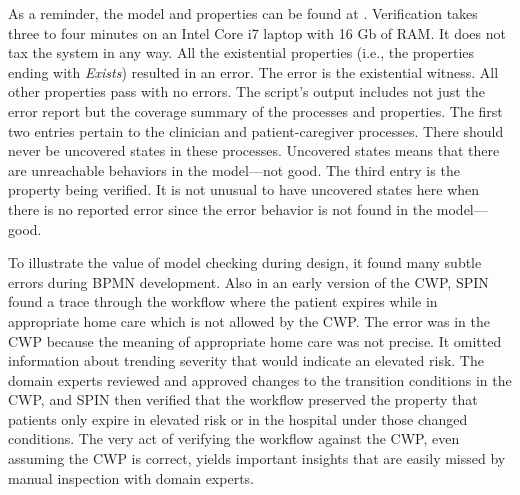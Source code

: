 
\begin{comment}
\begin{figure*}[t]
  \begin{center}
    \begin{tabular}{c}
      \texttt{[image: ../figs/proof-digest.png]}
    \end{tabular}
  \end{center}
\caption{Some of the verification results from the SPIN model checker.}
\label{fig:proof}
\end{figure*}
The results for the state properties for \texttt{ptInElevatedRiskHomeCare} with the measured time verifying the entire model is shown in \figref{fig:proof}.
\end{comment}

As a reminder, the model and properties can be found at \cite{repo}.
Verification takes three to four minutes on an Intel Core i7 laptop with 16 Gb of RAM. It does not tax the system in any way.
All the existential properties (i.e., the properties ending with \emph{Exists}) resulted in an error. The error is the existential witness.
All other properties pass with no errors. The script's output includes not just the error report but the coverage summary of the processes and properties.
The first two entries pertain to the clinician and patient-caregiver processes. There should never be uncovered states in these processes.
Uncovered states means that there are unreachable behaviors in the model---not good. The third entry is the property being verified.
It is not unusual to have uncovered states here when there is no reported error since the error behavior is not found in the model---good.

To illustrate the value of model checking during design, it found many subtle errors during BPMN development.
Also in an early version of the CWP, SPIN found a trace through the workflow where the patient expires while in appropriate home care which is not allowed by the CWP. The error was in the CWP because the meaning of appropriate home care was not precise. It omitted information about trending severity that would indicate an elevated risk. The domain experts reviewed and approved changes to the transition conditions in the CWP, and SPIN then verified that the workflow preserved the property that patients only expire in elevated risk or in the hospital under those changed conditions. The very act of verifying the workflow against the CWP, even assuming the CWP is correct, yields important insights that are easily missed by manual inspection with domain experts.